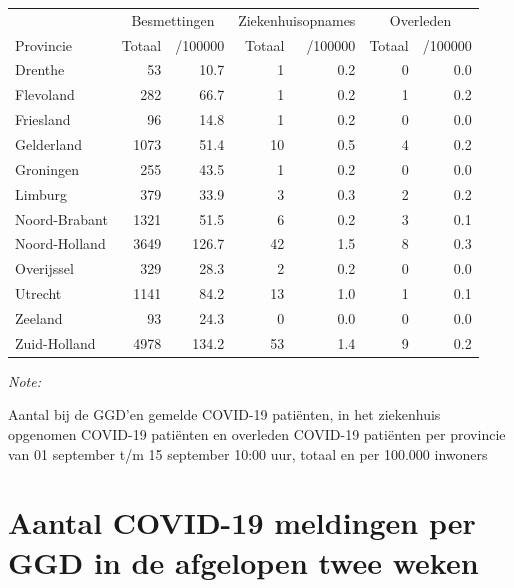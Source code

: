 \documentclass[
  english,
  man,floatsintext]{apa6}
\begin{document}
\begin{table}[H]
\centering
\begin{threeparttable}
\begin{tabular}{lrrrrrr}
\toprule
\multicolumn{1}{c}{ } & \multicolumn{2}{c}{Besmettingen} & \multicolumn{2}{c}{Ziekenhuisopnames} & \multicolumn{2}{c}{Overleden} \\
\cmidrule(l{3pt}r{3pt}){2-3} \cmidrule(l{3pt}r{3pt}){4-5} \cmidrule(l{3pt}r{3pt}){6-7}
Provincie & Totaal & /100000 & Totaal & /100000 & Totaal & /100000\\
\midrule
Drenthe & 53 & 10.7 & 1 & 0.2 & 0 & 0.0\\
Flevoland & 282 & 66.7 & 1 & 0.2 & 1 & 0.2\\
Friesland & 96 & 14.8 & 1 & 0.2 & 0 & 0.0\\
Gelderland & 1073 & 51.4 & 10 & 0.5 & 4 & 0.2\\
Groningen & 255 & 43.5 & 1 & 0.2 & 0 & 0.0\\
Limburg & 379 & 33.9 & 3 & 0.3 & 2 & 0.2\\
Noord-Brabant & 1321 & 51.5 & 6 & 0.2 & 3 & 0.1\\
Noord-Holland & 3649 & 126.7 & 42 & 1.5 & 8 & 0.3\\
Overijssel & 329 & 28.3 & 2 & 0.2 & 0 & 0.0\\
Utrecht & 1141 & 84.2 & 13 & 1.0 & 1 & 0.1\\
Zeeland & 93 & 24.3 & 0 & 0.0 & 0 & 0.0\\
Zuid-Holland & 4978 & 134.2 & 53 & 1.4 & 9 & 0.2\\
\bottomrule
\end{tabular}
\begin{tablenotes}
\item \textit{Note: } 
\item Aantal bij de GGD’en gemelde COVID-19 patiënten, in het ziekenhuis opgenomen COVID-19 patiënten en overleden COVID-19 patiënten per provincie van 01 september t/m 15 september 10:00 uur, totaal en per 100.000 inwoners
\end{tablenotes}
\end{threeparttable}
\end{table}

\newpage

\hypertarget{aantal-covid-19-meldingen-per-ggd-in-de-afgelopen-twee-weken}{%
\section{Aantal COVID-19 meldingen per GGD in de afgelopen twee weken}\label{aantal-covid-19-meldingen-per-ggd-in-de-afgelopen-twee-weken}}
\end{document}
